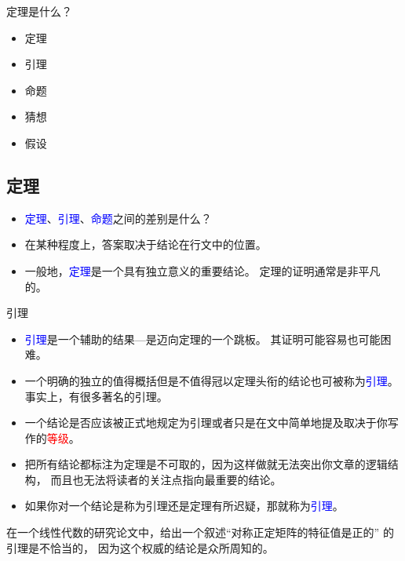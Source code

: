 \documentclass[13pt]{ctexbeamer}
\newcommand{\red}[1]{\textcolor{red}{#1}}
\newcommand{\blue}[1]{\textcolor{blue}{#1}}
\begin{document}
\begin{frame}{定理是什么？}

	
\begin{itemize}
	\item 定理
	\item 引理
	\item 命题
	\item 猜想
	\item 假设
\end{itemize}
\end{frame}

\subsection{定理}
\begin{frame}
\begin{itemize}
\item \blue{定理}、\blue{引理}、\blue{命题}之间的差别是什么？
\item 在某种程度上，答案取决于结论在行文中的位置。
\item 
一般地，\blue{定理}是一个具有独立意义的重要结论。
定理的证明通常是非平凡的。


\end{itemize}
\end{frame}




\begin{frame}{引理}
	
\begin{itemize}
	\item 
	\blue{引理}是一个辅助的结果—是迈向定理的一个跳板。
	其证明可能容易也可能困难。
	
\item 一个明确的独立的值得概括但是不值得冠以定理头衔的结论也可被称为\blue{引理}。
事实上，有很多著名的引理。
\item 
	一个结论是否应该被正式地规定为引理或者只是在文中简单地提及取决于你写作的\red{等级}。
\item 
\alert{把所有结论都标注为定理是不可取的}，因为这样做就无法突出你文章的逻辑结构，
而且也无法将读者的关注点指向最重要的结论。
\item 如果你对一个结论是称为引理还是定理有所迟疑，那就称为\blue{引理}。
\end{itemize}


在一个线性代数的研究论文中，给出一个叙述``对称正定矩阵的特征值是正的'' 的引理是不恰当的， 
因为这个权威的结论是众所周知的。

\end{frame}
\end{document}
